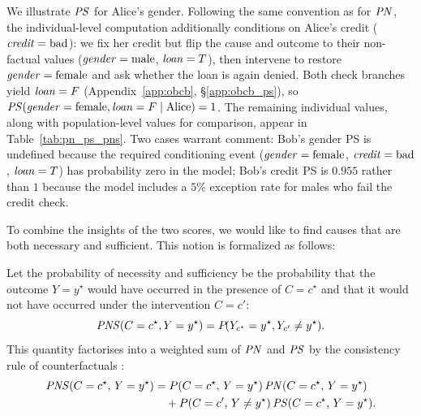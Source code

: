 We illustrate $\mathit{PS}$ for Alice's gender. Following the same convention as for
$\mathit{PN}$, the individual-level computation additionally conditions on Alice's
credit ($\varname{credit}=\text{bad}$): we fix her credit but flip the cause and
outcome to their non-factual values ($\varname{gender}=\text{male}$,
$\varname{loan}=T$), then intervene to restore $\varname{gender}=\text{female}$
and ask whether the loan is again denied. Both check branches yield
$\varname{loan}=F$ (Appendix~\ref{app:obcb}, \S\ref{app:obcb_ps}), so
$\ps(\varname{gender}=\text{female}, \varname{loan}=F \mid \text{Alice}) = 1$.
The remaining individual values, along with population-level values for comparison,
appear in Table~\ref{tab:pn_ps_pns}.
Two cases warrant comment: Bob's gender PS is undefined because the required
conditioning event ($\varname{gender}=\text{female}$, $\varname{credit}=\text{bad}$,
$\varname{loan}=T$) has probability zero in the model; Bob's credit PS is $0.955$
rather than $1$ because the model includes a $5\%$ exception rate for males who fail
the credit check.


To combine the insights of the two scores, we would like to find causes that are both necessary and sufficient.
This notion is  formalized as follows:

\begin{definition}
Let the probability of necessity and sufficiency be the probability that the outcome $Y=y^\star$ would have occurred in the presence of $C = c^\star$ and that it would not have occurred under the intervention $C=c'$:
\[\mathit{PNS}(C = c^{\star}, Y = y^\star) =  P\!(Y_{c^{\star}} = y^\star, Y_{c'} \neq y^\star ).\]
This quantity factorises into a weighted sum of $\mathit{PN}$ and $\mathit{PS}$ by the
consistency rule of counterfactuals
\citep[\S 9.2]{causalityPearl}:
\[
  \begin{aligned}
    \mathit{PNS}(C = c^\star,\, Y = y^\star)
    &= P(C = c^\star,\, Y = y^\star)\,\mathit{PN}(C = c^\star,\, Y = y^\star) \\
    &\quad + P(C = c',\, Y \neq y^\star)\,\mathit{PS}(C = c^\star,\, Y = y^\star).
  \end{aligned}
\]
\end{definition}

